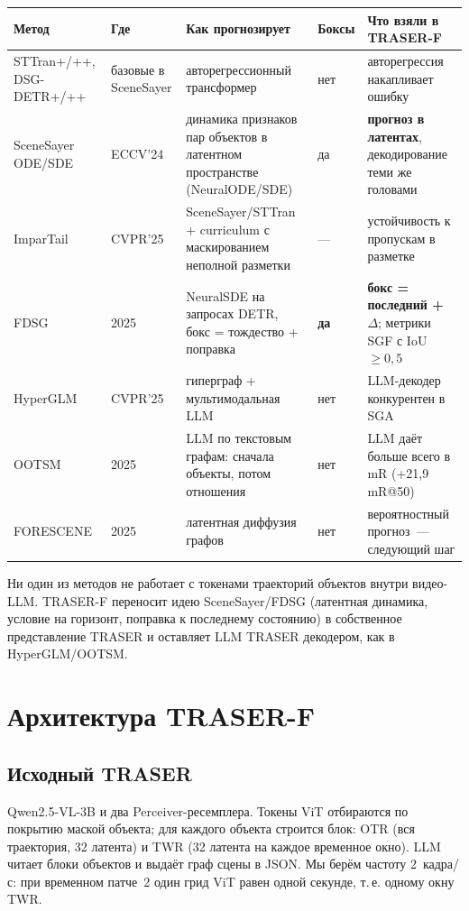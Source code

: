 \documentclass[11pt,a4paper]{article}
\begin{document}
\begin{center}
\small
\begin{tabularx}{\linewidth}{@{}p{2.6cm}p{1.6cm}Lp{0.9cm}L@{}}
\toprule
Метод & Где & Как прогнозирует & Боксы & Что взяли в TRASER-F \\
\midrule
STTran+/++, DSG-DETR+/++ & базовые в SceneSayer & авторегрессионный трансформер & нет & авторегрессия накапливает ошибку \\
SceneSayer ODE/SDE & ECCV'24 & динамика признаков пар объектов в латентном пространстве (NeuralODE/SDE) & да & \textbf{прогноз в латентах}, декодирование теми же головами \\
ImparTail & CVPR'25 & SceneSayer/STTran + curriculum с маскированием неполной разметки & --- & устойчивость к пропускам в разметке \\
FDSG & 2025 & NeuralSDE на запросах DETR, бокс = тождество + поправка & \textbf{да} & \textbf{бокс = последний + $\Delta$}; метрики SGF с IoU $\ge 0{,}5$ \\
HyperGLM & CVPR'25 & гиперграф + мультимодальная LLM & нет & LLM-декодер конкурентен в SGA \\
OOTSM & 2025 & LLM по текстовым графам: сначала объекты, потом отношения & нет & LLM даёт больше всего в mR (+21,9 mR@50) \\
FORESCENE & 2025 & латентная диффузия графов & нет & вероятностный прогноз~--- следующий шаг \\
\bottomrule
\end{tabularx}
\end{center}

Ни один из методов не работает с токенами траекторий объектов внутри видео-LLM.
TRASER-F переносит идею SceneSayer/FDSG (латентная динамика, условие на горизонт, поправка
к последнему состоянию) в собственное представление TRASER и оставляет LLM TRASER
декодером, как в HyperGLM/OOTSM.

\section{Архитектура TRASER-F}

\subsection{Исходный TRASER}
Qwen2.5-VL-3B и два Perceiver-ресемплера. Токены ViT отбираются по покрытию маской объекта;
для каждого объекта строится блок: OTR (вся траектория, 32 латента) и TWR (32 латента на
каждое временное окно). LLM читает блоки объектов и выдаёт граф сцены в JSON.
Мы берём частоту 2~кадра/с: при временном патче~2 один грид ViT равен одной секунде,
т.\,е. одному окну TWR.
\end{document}
